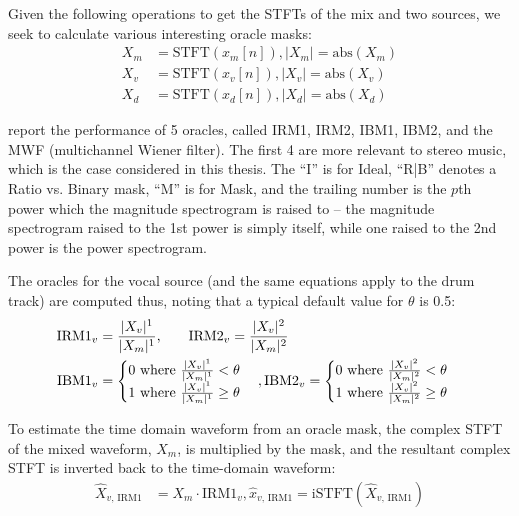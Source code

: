 \documentclass[report.tex]{subfiles}
\begin{document}
Given the following operations to get the STFTs of the mix and two sources, we seek to calculate various interesting oracle masks:
\begin{align}
	\nonumber X_{m} &= \text{STFT}(x_{m}[n]), |X_{m}| = \text{abs}(X_{m})\\
	\nonumber X_{v} &= \text{STFT}(x_{v}[n]), |X_{v}| = \text{abs}(X_{v})\\
	\nonumber X_{d} &= \text{STFT}(x_{d}[n]), |X_{d}| = \text{abs}(X_{d})
\end{align}
 
\textcite{sisec2018} report the performance of 5 oracles, called IRM1, IRM2, IBM1, IBM2, and the MWF (multichannel Wiener filter). The first 4 are more relevant to stereo music, which is the case considered in this thesis. The ``I'' is for Ideal, ``R|B'' denotes a Ratio vs. Binary mask, ``M'' is for Mask, and the trailing number is the $p$th power which the magnitude spectrogram is raised to -- the magnitude spectrogram raised to the 1st power is simply itself, while one raised to the 2nd power is the power spectrogram.

The oracles for the vocal source (and the same equations apply to the drum track) are computed thus, noting that a typical default value for $\theta$ is 0.5:
\begin{align}
	\nonumber \text{IRM1}_{v} &= \frac{|X_{v}|^{1}}{|X_{m}|^{1}}\text{,\qquad}
	\nonumber \text{IRM2}_{v} = \frac{|X_{v}|^{2}}{|X_{m}|^{2}}\\
	\nonumber \text{IBM1}_{v} &= \begin{cases}
		0 \text{ where } \frac{|X_{v}|^{1}}{|X_{m}|^{1}} < \theta\\
		1 \text{ where } \frac{|X_{v}|^{1}}{|X_{m}|^{1}} \ge \theta
	\end{cases},
	\nonumber \text{IBM2}_{v} = \begin{cases}
		0 \text{ where } \frac{|X_{v}|^{2}}{|X_{m}|^{2}} < \theta\\
		1 \text{ where } \frac{|X_{v}|^{2}}{|X_{m}|^{2}} \ge \theta
	\end{cases}
\end{align}

To estimate the time domain waveform from an oracle mask, the complex STFT of the mixed waveform, $X_{m}$, is multiplied by the mask, and the resultant complex STFT is inverted back to the time-domain waveform:
\begin{align}
	\nonumber \hat{X}_{v\text{, IRM1}} &= X_{m} \cdot \text{IRM1}_{v}, \hat{x}_{v\text{, IRM1}} = \text{iSTFT}(\hat{X}_{v\text{, IRM1}})
\end{align}
\end{document}
